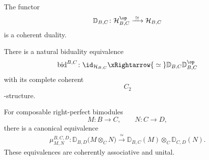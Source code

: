 \begin{proposition}
\label{prop:coherent-transported-hom-duality}
The functor
\[
    \mathbb D_{B,C}
    \colon
    \mathcal H_{B,C}^{\op}
    \xrightarrow{\;\simeq\;}
    \mathcal H_{B,C}
\]
is a coherent duality.

There is a natural biduality equivalence
\[
    \operatorname{bid}^{B,C}
    \colon
    \id_{\mathcal H_{B,C}}
    \xRightarrow{\;\simeq\;}
    \mathbb D_{B,C}\mathbb D_{B,C}^{\op}
\]
with its complete coherent
\[
    C_2
\]
-structure.

For composable right-perfect bimodules
\[
    M
    \colon
    B
    \longrightarrow
    C,
    \qquad
    N
    \colon
    C
    \longrightarrow
    D,
\]
there is a canonical equivalence
\[
\begin{aligned}
    \mu^{B,C,D}_{M,N}
    \colon
    \mathbb D_{B,D}
    \bigl(
        M\otimes_CN
    \bigr)
    \xrightarrow{\;\simeq\;}
    \mathbb D_{B,C}(M)
    \otimes_C
    \mathbb D_{C,D}(N).
\end{aligned}
\]
These equivalences are coherently associative and unital.
\end{proposition}

